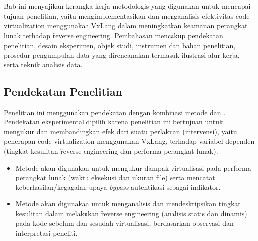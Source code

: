 \chapter{\babTiga}
Bab ini menyajikan kerangka kerja metodologis yang digunakan untuk mencapai tujuan penelitian, yaitu mengimplementasikan dan menganalisis efektivitas \f{code virtualization} menggunakan VxLang dalam meningkatkan keamanan perangkat lunak terhadap \f{reverse engineering}. Pembahasan mencakup pendekatan penelitian, desain eksperimen, objek studi, instrumen dan bahan penelitian, prosedur pengumpulan data yang direncanakan termasuk ilustrasi alur kerja, serta teknik analisis data.

\section{Pendekatan Penelitian}
Penelitian ini menggunakan pendekatan  dengan kombinasi metode  dan . Pendekatan eksperimental dipilih karena penelitian ini bertujuan untuk mengukur dan membandingkan efek dari suatu perlakuan (intervensi), yaitu penerapan \f{code virtualization} menggunakan VxLang, terhadap variabel dependen (tingkat kesulitan \f{reverse engineering} dan performa perangkat lunak).
\begin{itemize}
    \item Metode  akan digunakan untuk mengukur dampak virtualisasi pada performa perangkat lunak (waktu eksekusi dan ukuran file) serta mencatat keberhasilan/kegagalan upaya \textit{bypass} autentikasi sebagai indikator.
    \item Metode  akan digunakan untuk menganalisis dan mendeskripsikan tingkat kesulitan dalam melakukan \f{reverse engineering} (analisis statis dan dinamis) pada kode sebelum dan sesudah virtualisasi, berdasarkan observasi dan interpretasi peneliti.
\end{itemize}


